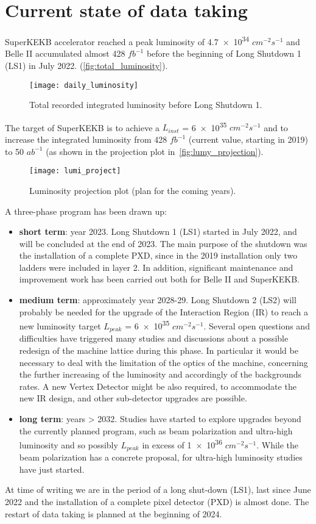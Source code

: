 \section{Current state of data taking} \label{sec:perspectives}

SuperKEKB accelerator reached a peak luminosity of \num{4.7e34} $cm^{-2}s^{-1}$ and Belle II accumulated almost 428 $fb^{-1}$ before the beginning of Long Shutdown 1 (LS1) in July 2022. (\autoref{fig:total_luminosity}).

\begin{figure}[h!]
\centering
\texttt{[image: daily\_luminosity]}
\caption{Total recorded integrated luminosity before Long Shutdown 1.}
\label{fig:total_luminosity}
\end{figure}

The target of SuperKEKB is to achieve a \textit{$L_{inst}$} = \num{6e35} $cm^{-2}s^{-1}$ and to increase the integrated luminosity from 428 $fb^{-1}$ (current value, starting in 2019) to 50 $ab^{-1}$ (as shown in the projection plot in~\autoref{fig:lumy_projection}).\\

\begin{figure}
\centering
\texttt{[image: lumi\_project]}
\caption{Luminosity projection plot (plan for the coming years).}
\label{fig:lumy_projection}
\end{figure}


A three-phase program has been drawn up\cite{Forti:2022mti}:

\begin{itemize}
\item \textbf{short term}: year 2023. Long Shutdown 1 (LS1) started in July 2022, and will be concluded at the end of 2023. The main purpose of the shutdown was the installation of a complete PXD, since in the 2019 installation only two ladders were included in layer 2. In addition, significant maintenance and improvement work has been carried out both for Belle II and SuperKEKB.
\item \textbf{medium term}: approximately year 2028-29. Long Shutdown 2 (LS2) will probably be needed for the upgrade of the Interaction Region (IR) to reach a new luminosity target $\textit{L}_{peak}$ = \num{6e35} $cm^{-2}s^{-1}$. 
Several open questions and difficulties have triggered many studies and discussions about a possible redesign of the machine lattice during this phase. In particular it would be necessary to deal with the limitation of the optics of the machine, concerning the further increasing of the luminosity and accordingly of the backgrounds rates. A new Vertex Detector might be also required, to accommodate the new IR design, and other sub-detector upgrades are possible. 
\item \textbf{long term}: years > 2032. Studies have started to explore upgrades beyond the currently planned program, such as beam polarization and ultra-high luminosity and so possibly $\textit{L}_{peak}$ in excess of \num{1e36} $cm^{-2}s^{-1}$. While the beam polarization has a concrete proposal, for ultra-high luminosity studies have just started.
\end{itemize}

At time of writing we are in the period of a long shut-down (LS1), last since June 2022 and the installation of a complete pixel detector (PXD) is almost done. The restart of data taking is planned at the beginning of 2024.

